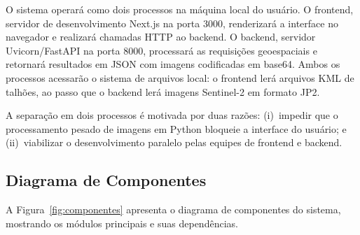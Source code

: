 \documentclass[12pt, a4paper]{article}
\begin{document}
O sistema operará como dois processos na máquina local do usuário. O frontend, servidor de desenvolvimento Next.js na porta 3000, renderizará a interface no navegador e realizará chamadas HTTP ao backend. O backend, servidor Uvicorn/FastAPI na porta 8000, processará as requisições geoespaciais e retornará resultados em JSON com imagens codificadas em base64. Ambos os processos acessarão o sistema de arquivos local: o frontend lerá arquivos KML de talhões, ao passo que o backend lerá imagens Sentinel-2 em formato JP2.

A separação em dois processos é motivada por duas razões: (i)~impedir que o processamento pesado de imagens em Python bloqueie a interface do usuário; e (ii)~viabilizar o desenvolvimento paralelo pelas equipes de frontend e backend.

\subsection{Diagrama de Componentes}

A Figura~\ref{fig:componentes} apresenta o diagrama de componentes do sistema, mostrando os módulos principais e suas dependências.
\end{document}
